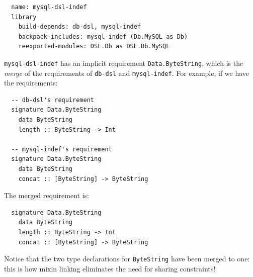 \begin{verbatim}
  name: mysql-dsl-indef
  library
    build-depends: db-dsl, mysql-indef
    backpack-includes: mysql-indef (Db.MySQL as Db)
    reexported-modules: DSL.Db as DSL.Db.MySQL
\end{verbatim}
%
\verb|mysql-dsl-indef| has an implicit requirement
\verb|Data.ByteString|, which is the \emph{merge} of the
requirements of \verb|db-dsl| and \verb|mysql-indef|.  For
example, if we have the requirements:

\begin{verbatim}
  -- db-dsl's requirement
  signature Data.ByteString
    data ByteString
    length :: ByteString -> Int

  -- mysql-indef's requirement
  signature Data.ByteString
    data ByteString
    concat :: [ByteString] -> ByteString
\end{verbatim}
%
The merged requirement is:

\begin{verbatim}
  signature Data.ByteString
    data ByteString
    length :: ByteString -> Int
    concat :: [ByteString] -> ByteString
\end{verbatim}
%
Notice that the two type declarations for \verb|ByteString| have been
merged to one: this is how mixin linking eliminates the need
for sharing constraints!

